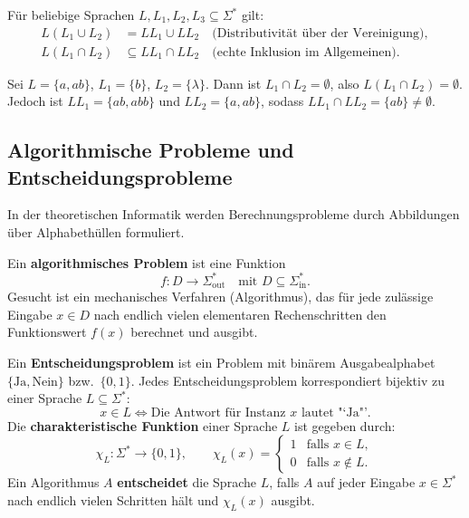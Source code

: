 \begin{lemma}
    Für beliebige Sprachen $L, L_1, L_2, L_3 \subseteq \Sigma^*$ gilt:
    \begin{align*}
        L(L_1 \cup L_2) &= LL_1 \cup LL_2 \quad \text{(Distributivität über der Vereinigung)}, \\
        L(L_1 \cap L_2) &\subseteq LL_1 \cap LL_2 \quad \text{(echte Inklusion im Allgemeinen)}.
    \end{align*}
\end{lemma}

\begin{beispiel}
    Sei $L = \{a, ab\}$, $L_1 = \{b\}$, $L_2 = \{\lambda\}$.
    Dann ist $L_1 \cap L_2 = \emptyset$, also $L(L_1 \cap L_2) = \emptyset$.
    Jedoch ist $LL_1 = \{ab, abb\}$ und $LL_2 = \{a, ab\}$, sodass $LL_1 \cap LL_2 = \{ab\} \neq \emptyset$.
\end{beispiel}

\subsection{Algorithmische Probleme und Entscheidungsprobleme}

In der theoretischen Informatik werden Berechnungsprobleme durch Abbildungen über Alphabethüllen formuliert.

\begin{definition}
    Ein \textbf{algorithmisches Problem} ist eine Funktion
    \[
        f : D \to \Sigma_{\mathrm{out}}^* \quad \text{mit } D \subseteq \Sigma_{\mathrm{in}}^*.
    \]
    Gesucht ist ein mechanisches Verfahren (Algorithmus), das für jede zulässige Eingabe $x \in D$ nach endlich vielen elementaren Rechenschritten den Funktionswert $f(x)$ berechnet und ausgibt.
\end{definition}

\begin{definition}
    Ein \textbf{Entscheidungsproblem} ist ein Problem mit binärem Ausgabealphabet $\{\mathrm{Ja}, \mathrm{Nein}\}$ bzw.\ $\{0, 1\}$.
    Jedes Entscheidungsproblem korrespondiert bijektiv zu einer Sprache $L \subseteq \Sigma^*$:
    \[
        x \in L \iff \text{Die Antwort für Instanz } x \text{ lautet "`Ja"'}.
    \]
    Die \textbf{charakteristische Funktion} einer Sprache $L$ ist gegeben durch:
    \[
        \chi_L : \Sigma^* \to \{0, 1\}, \qquad \chi_L(x) = \begin{cases} 1 & \text{falls } x \in L, \\ 0 & \text{falls } x \notin L. \end{cases}
    \]
    Ein Algorithmus $A$ \textbf{entscheidet} die Sprache $L$, falls $A$ auf jeder Eingabe $x \in \Sigma^*$ nach endlich vielen Schritten hält und $\chi_L(x)$ ausgibt.
\end{definition}

